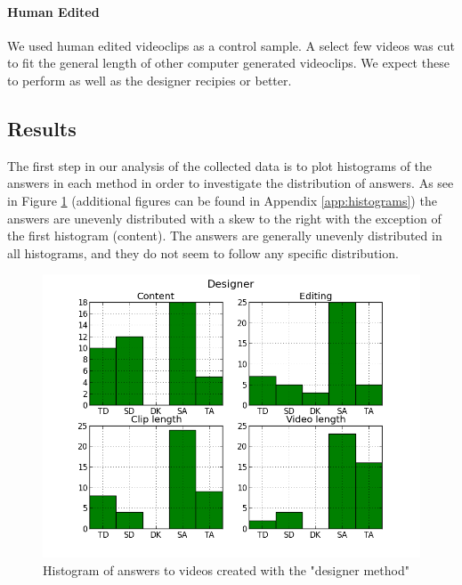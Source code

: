 \paragraph{Human Edited}
% 
We used human edited videoclips as a control sample. A select few videos was cut to fit the general length of other computer generated videoclips.
%
%
We expect these to perform as well as the designer recipies or better.
%
\subsection{Results}
%
The first step in our analysis of the collected data is to plot histograms of the answers in each method in order to investigate the distribution of answers. As see in Figure \ref{fig:hist_design} (additional figures can be found in Appendix \ref{app:histograms}) the answers are unevenly distributed with a skew to the right with the exception of the first histogram (content). The answers are generally unevenly distributed in all histograms, and they do not seem to follow any specific distribution. %
%
\begin{figure}
     \centering
     \includegraphics[width=1.0\textwidth]{img/designer_barplot.png}
     \caption{Histogram of answers to videos created with the "designer method"}\label{fig:hist_design}
\end{figure}\\
